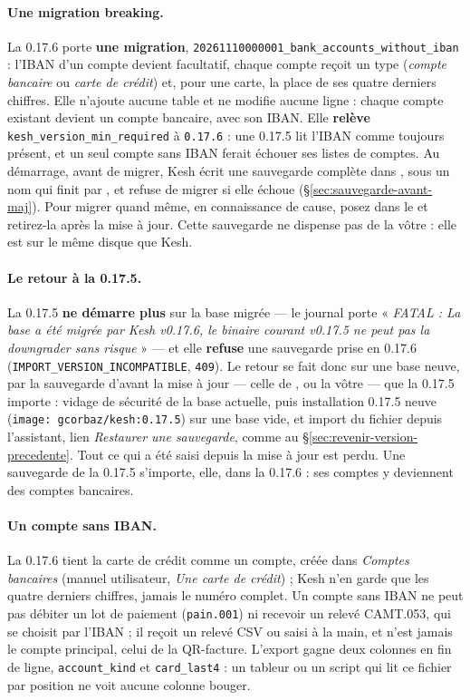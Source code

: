 \documentclass[a4paper,11pt,oneside]{article}
\begin{document}
\paragraph{Une migration breaking.} La 0.17.6 porte \textbf{une migration}, \texttt{20261110000001\_bank\_accounts\allowbreak\_without\_iban} : l'IBAN d'un compte devient facultatif, chaque compte reçoit un type (\emph{compte bancaire} ou \emph{carte de crédit}) et, pour une carte, la place de ses quatre derniers chiffres. Elle n'ajoute aucune table et ne modifie aucune ligne : chaque compte existant devient un compte bancaire, avec son IBAN. Elle \textbf{relève} \texttt{kesh\_version\_min\_required} à \texttt{0.17.6} : une 0.17.5 lit l'IBAN comme toujours présent, et un seul compte sans IBAN ferait échouer ses listes de comptes. Au démarrage, avant de migrer, Kesh écrit une sauvegarde complète dans , sous un nom qui finit par , et refuse de migrer si elle échoue (\S\ref{sec:sauvegarde-avant-maj}). Pour migrer quand même, en connaissance de cause, posez  dans le  et retirez-la après la mise à jour. Cette sauvegarde ne dispense pas de la vôtre : elle est sur le même disque que Kesh.

\paragraph{Le retour à la 0.17.5.} La 0.17.5 \textbf{ne démarre plus} sur la base migrée --- le journal porte « \emph{FATAL : La base a été migrée par Kesh v0.17.6, le binaire courant v0.17.5 ne peut pas la downgrader sans risque} » --- et elle \textbf{refuse} une sauvegarde prise en 0.17.6 (\texttt{IMPORT\_VERSION\_INCOMPATIBLE}, \texttt{409}). Le retour se fait donc sur une base neuve, par la sauvegarde d'avant la mise à jour --- celle de , ou la vôtre --- que la 0.17.5 importe : vidage de sécurité de la base actuelle, puis installation 0.17.5 neuve (\texttt{image: gcorbaz/kesh:0.17.5}) sur une base vide, et import du fichier depuis l'assistant, lien \emph{Restaurer une sauvegarde}, comme au \S\ref{sec:revenir-version-precedente}. Tout ce qui a été saisi depuis la mise à jour est perdu. Une sauvegarde de la 0.17.5 s'importe, elle, dans la 0.17.6 : ses comptes y deviennent des comptes bancaires.

\paragraph{Un compte sans IBAN.} La 0.17.6 tient la carte de crédit comme un compte, créée dans \emph{Comptes bancaires} (manuel utilisateur, \emph{Une carte de crédit}) ; Kesh n'en garde que les quatre derniers chiffres, jamais le numéro complet. Un compte sans IBAN ne peut pas débiter un lot de paiement (\texttt{pain.001}) ni recevoir un relevé CAMT.053, qui se choisit par l'IBAN ; il reçoit un relevé CSV ou saisi à la main, et n'est jamais le compte principal, celui de la QR-facture. L'export  gagne deux colonnes en fin de ligne, \texttt{account\_kind} et \texttt{card\_last4} : un tableur ou un script qui lit ce fichier par position ne voit aucune colonne bouger.
\end{document}
